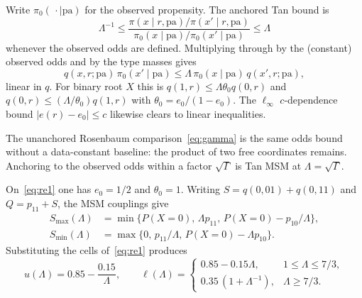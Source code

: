 Write $\pi_0(\,\cdot\mid\mathrm{pa})$ for the observed propensity.
The anchored Tan bound is
\[
\Lambda^{-1}
\le
\frac{\pi(x\mid r,\mathrm{pa})/\pi(x'\mid r,\mathrm{pa})}
{\pi_0(x\mid\mathrm{pa})/\pi_0(x'\mid\mathrm{pa})}
\le
\Lambda
\]
whenever the observed odds are defined. Multiplying through by the
(constant) observed odds and by the type masses gives
\[
q(x,r;\mathrm{pa})\,\pi_0(x'\mid\mathrm{pa})
\le
\Lambda\,\pi_0(x\mid\mathrm{pa})\,q(x',r;\mathrm{pa}),
\]
linear in $q$. For binary root $X$ this is
$q(1,r)\le\Lambda\theta_0 q(0,r)$ and
$q(0,r)\le(\Lambda/\theta_0)q(1,r)$ with
$\theta_0=e_0/(1-e_0)$. The $\ell_\infty$ $c$-dependence bound
$\lvert e(r)-e_0\rvert\le c$ likewise clears to linear inequalities.

The unanchored Rosenbaum comparison~\eqref{eq:gamma} is the same odds
bound without a data-constant baseline: the product of two free
coordinates remains. Anchoring to the observed odds within a factor
$\sqrt{\Gamma}$ is Tan MSM at $\Lambda=\sqrt{\Gamma}$.

On~\eqref{eq:re1} one has $e_0=1/2$ and $\theta_0=1$. Writing
$S=q(0,01)+q(0,11)$ and $Q=p_{11}+S$, the MSM couplings give
\begin{align*}
S_{\max}(\Lambda)
&=
\min\bigl\{P(X{=}0),\,\Lambda p_{11},\,P(X{=}0)-p_{10}/\Lambda\bigr\},
\\
S_{\min}(\Lambda)
&=
\max\bigl\{0,\,p_{11}/\Lambda,\,P(X{=}0)-\Lambda p_{10}\bigr\}.
\end{align*}
Substituting the cells of~\eqref{eq:re1} produces
\[
u(\Lambda)=0.85-\frac{0.15}{\Lambda},
\qquad
\ell(\Lambda)
=
\begin{cases}
0.85-0.15\Lambda, & 1\le\Lambda\le 7/3,\\
0.35\,(1+\Lambda^{-1}), & \Lambda\ge 7/3.
\end{cases}
\]

